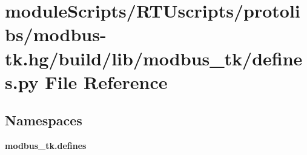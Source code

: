 \section{module\+Scripts/\+R\+T\+Uscripts/protolibs/modbus-\/tk.hg/build/lib/modbus\+\_\+tk/defines.py File Reference}
\label{modbus-tk_8hg_2build_2lib_2modbus__tk_2defines_8py}
\subsection*{Namespaces}
\begin{DoxyCompactItemize}
\item 
 {\bf modbus\+\_\+tk.\+defines}
\end{DoxyCompactItemize}
